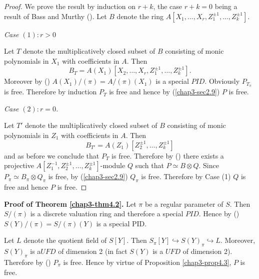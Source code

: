 \begin{proof}
We prove the result by induction on $r+k$, the case $r+k=0$ being a
result of Bass and Murthy (\cite[Proposition 9.6]{chap3-B-M}). Let $B$
denote the ring $A[X_{1},\ldots,X_{r},Z^{\pm 1}_{1},\ldots,Z^{\pm
1}_{k}]$. 

\medskip
\noindent
{\em Case $(1):r>0$}

Let $T$ denote the multiplicatively closed subset of $B$ consisting of
monic polynomials in $X_{1}$ with coefficients in
$A$. Then\pageoriginale 
$$
B_{T}=A(X_{1})[X_{2},\ldots,X_{r},Z^{\pm
1}_{1},\ldots,Z^{\pm 1}_{k}].
$$ 
Moreover by (\cite[Proposition
$1'$]{chap3-Mu}) $A(X_{1})/(\pi)=A/(\pi)(X_{1})$ is a special
$PID$. Obviously $P_{T_{\pi}}$ is free. Therefore by induction $P_{T}$
is free and hence by (\ref{chap3-sec2.9}) $P$ is free.

\medskip
\noindent
{\em Case $(2):r=0$.}

Let $T'$ denote the multiplicatively closed subset of $B$ consisting
of monic polynomials in $Z_{1}$ with coefficients in $A$. Then
$$
B_{T'}=A(Z_{1})[Z^{\pm 1}_{2},\ldots,Z^{\pm 1}_{k}]
$$ 
and as before we
conclude that $P_{T}$ is free. Therefore by (\cite[Lemma
1.3]{chap3-Sw}) there exists a projective $A[Z^{-1}_{1},Z^{\pm
1}_{2},\ldots,Z^{\pm 1}_{k}]$-module $Q$ such that $P\simeq B\otimes
Q$. Since $P_{\pi}\simeq B_{\pi}\otimes Q_{\pi}$ is free,
by (\ref{chap3-sec2.9}) $Q_{\pi}$ is free. Therefore by Case (1) $Q$ is
free and hence $P$ is free.
\end{proof}

\medskip
\noindent
{\bf Proof of Theorem \ref{chap3-thm4.2}.} Let $\pi$ be a regular
parameter of $S$. Then $S/(\pi)$ is a discrete valuation ring and
therefore a special $PID$. Hence by (\cite[Proposition $1'$]{chap3-M})
$S(Y)/(\pi)=S/(\pi)(Y)$ is a special PID.

Let $L$ denote the quotient field of $S[Y]$. Then
$S_{\pi}[Y]\hookrightarrow S(Y)_{\pi}\hookrightarrow L$. Moreover,
$S(Y)_{\pi}$ is a$UFD$ of dimension 2 (in fact $S(Y)$ is a $UFD$ of
dimension 2). Therefore by (\cite[Proposition 2.1]{chap3-B-R})
$P_{\pi}$ is free. Hence by virtue of Proposition \ref{chap3-prop4.3},
$P$ is free. 


